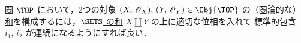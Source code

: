 \documentclass[geometry_main]{subfiles}
\begin{document}
圏 $\TOP$ において，2つの対象 $\phase{X},\, \phase{Y} \in \Obj{\TOP}$ の（圏論的な）\hyperref[def:sum]{和}を構成するには，\hyperref[prop:sum-sets]{$\SETS$ の和} $X \amalg Y$ の上に適切な位相を入れて
標準的包含 $i_1,\, i_2$ が連続になるようにすれば良い．
\end{document}
